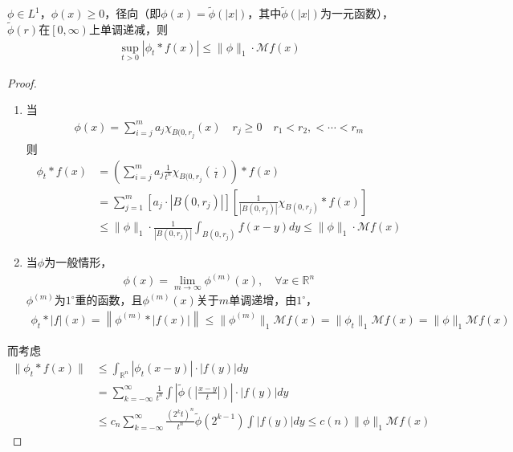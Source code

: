 \begin{lemma}
    $\phi\in L^1$，$\phi(x)\geqslant 0$，径向（即$\phi(x) = \widetilde{\phi}(|x|)$，其中$\widetilde{\phi}(|x|)$为一元函数），$\widetilde{\phi}(r)$在$\left[0,\infty\right)$上单调递减，则
    \begin{align*}
        \sup\limits_{t>0} |\phi_t * f(x)| \leqslant \|\phi\|_1 \cdot \mathcal{M}f(x)
    \end{align*}
\end{lemma}
\begin{proof}
    \begin{enumerate}[leftmargin=1cm, label=\arabic*${}^{\circ}$]
        \item 当
        \begin{align*}
            \phi(x) = \sum\limits_{i=j}^{m} a_j \chi_{B(0,r_j} (x) \quad r_j\geqslant 0\quad r_1<r_2,<\cdots<r_m
        \end{align*}
        则
        \begin{align*}
            \phi_t*f(x) &= \left(\sum\limits_{i=j}^{m} a_j \frac{1}{t^n} \chi_{B(0,r_j} \left(\frac{\cdot}{t}\right)\right) * f(x) \\
            &= \sum\limits_{j=1}^m [a_j\cdot |B(0,r_j)|] \left[ \frac{1}{|B(0,r_j)|} \chi_{B(0,r_j)} * f(x) \right] \\
            &\leqslant \|\phi\|_1 \cdot \frac{1}{|B(0,r_j)|} \int_{B(0,r_j)} f(x-y) dy \leqslant \|\phi\|_1 \cdot \mathcal{M}f(x)
        \end{align*}

        \item 当$\phi$为一般情形，
        \begin{align*}
            \phi(x) = \lim\limits_{m\to\infty} \phi^{(m)} (x),\quad \forall x\in \mathbb{R}^n 
        \end{align*}
        $\phi^{(m)}$为$1^{\circ}$重的函数，且$\phi^{(m)}(x)$关于$m$单调递增，由$1^{\circ}$，
        \begin{align*}
            \phi_t * |f|(x) = \left\| \phi^{(m)} * |f(x)| \right\| \leqslant \|\phi^{(m)} \|_1 \mathcal{M} f(x) = \|\phi_t\|_1 \mathcal{M} f(x) = \|\phi\|_1 \mathcal{M} f(x)
        \end{align*}
    \end{enumerate}

    而考虑
    \begin{align*}
        \| \phi_t * f(x)\| &\leqslant \int_{\mathbb{R}^n} |\phi_t(x-y)| \cdot |f(y)| dy \\
        &= \sum\limits_{k=-\infty}^{\infty} \frac{1}{t^n} \int \left| \widetilde{\phi}\left(\left|\frac{x-y}{t}\right|\right) \right|\cdot |f(y)| dy \\
        & \leqslant c_n \sum\limits_{k=-\infty}^{\infty} \frac{(2^k t)^n}{t^n} \widetilde{\phi}(2^{k-1}) \int |f(y)| dy \leqslant c(n) \|\phi\|_1 \mathcal{M}f(x)
    \end{align*}
\end{proof}


